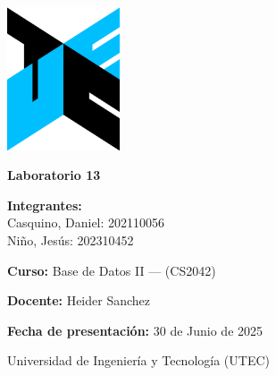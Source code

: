 \begin{titlepage}
    \pagestyle{empty}
    \begin{center}
        \includegraphics[width=0.25\textwidth]{isologo-utec.png} %
        \vspace{1cm}

        {\LARGE\textbf{Laboratorio 13}}
        \vspace{1.5cm}

        {\large
            \textbf{Integrantes:} \\
            Casquino, Daniel: 202110056 \\
            Niño, Jesús: 202310452 \\
        }
        \vspace{1cm}

        {\large
            \textbf{Curso:} Base de Datos II --- (CS2042)
        }
        \vspace{0.5cm}

        {\large
            \textbf{Docente:} Heider Sanchez
        }
        \vspace{0.5cm}

        {\large
            \textbf{Fecha de presentación:} 30 de Junio de 2025
        }
        \vfill

        {\large
            Universidad de Ingeniería y Tecnología (UTEC)
        }
    \end{center}
\end{titlepage}